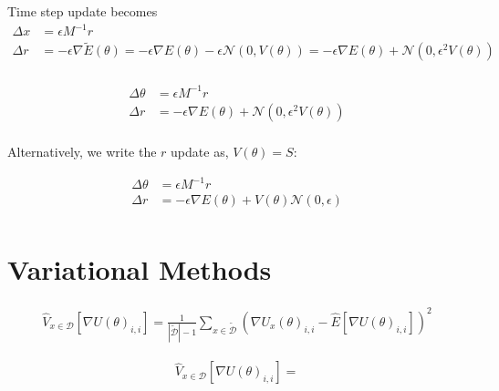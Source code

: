 



Time step update becomes
\begin{align*}
    \Delta x &= \epsilon M^{-1} r \\
    \Delta r &= -\epsilon\nabla\tilde{E}(\theta) 
    = -\epsilon\nabla{E}(\theta)  -\epsilon \mathcal{N}(0, V(\theta))
    = -\epsilon\nabla{E}(\theta)  +\mathcal{N}(0, \epsilon^2 V(\theta)) \\
\end{align*}

\begin{align*}
    \Delta \theta &= \epsilon M^{-1} r \\
    \Delta r &=  -\epsilon\nabla{E}(\theta) + \mathcal{N}(0, \epsilon^2 V(\theta)) \\
\end{align*}


Alternatively, we write the $r$ update as, $V(\theta) = S$:



\begin{align*}
    \Delta \theta &= \epsilon M^{-1} r \\
    \Delta r &=  -\epsilon\nabla{E}(\theta) + V(\theta) \mathcal{N}(0, \epsilon) \\
\end{align*}

\section{Variational Methods}

\begin{align*}
    \hat V_{x\in \mathcal D}[\nabla U(\theta)_{i,i} ] = \frac{1}{|\tilde{\mathcal{D}}|-1} \sum_{x\in \tilde{\mathcal{D}}} (\nabla U_x(\theta)_{i,i} - \hat{E}[\nabla U(\theta)_{i,i}])^2
\end{align*}

\begin{align*}
    \hat V_{x\in \mathcal D}[\nabla U(\theta)_{i,i} ] = 
\end{align*}